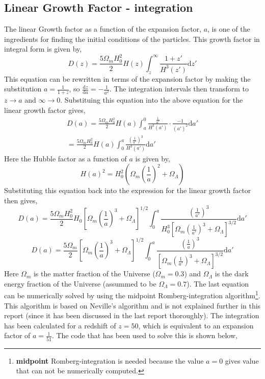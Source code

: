 


\subsection{Linear Growth Factor - integration}

The linear Growth factor as a function of the expansion factor, $a$, is one of the ingredients for finding the initial conditions of the particles. This growth factor in integral form is given by,
\begin{equation*}
D(z) = \frac{5\Omega_mH_0^2}{2}H(z) \int_z^{\infty} \frac{1+z'}{H^3(z')}\mathrm{d}z'
\end{equation*}
This equation can be rewritten in terms of the expansion factor by making the substitution $a = \frac{1}{1+z}$, so $\frac{\mathrm{d}z}{\mathrm{d}a} = -\frac{1}{a^2}$. The integration intervals then transform to $z \rightarrow a$ and $\infty \rightarrow 0$. Substituing this equation into the above equation for the linear growth factor gives,
\begin{gather*}
D(a) = \frac{5\Omega_m H_0^2}{2}H(a) \int_a^0 \frac{\frac{1}{a'}}{H^3(a')}\cdot \frac{-1}{(a')^2}\mathrm{d}a'\\
= \frac{5\Omega_m H_0^2}{2}H(a) \int_0^a \frac{\left(\frac{1}{a'}\right)^3}{H^3(a')}\mathrm{d}a'
\end{gather*}
Here the Hubble factor as a function of $a$ is given by,
\begin{equation*}
H(a)^2 = H_0^2 (\Omega_m\left(\frac{1}{a}\right)^2 + \Omega_{\Lambda})
\end{equation*}
Substituting this equation back into the expression for the linear growth factor then gives,
\begin{equation*}
D(a) = \frac{5\Omega_mH_0^2}{2}H_0 \left[\Omega_m\left(\frac{1}{a}\right)^3 + \Omega_{\Lambda}\right]^{1/2} \int_0^a \frac{\left(\frac{1}{a'}\right)^3}{H_0^3 \left[\Omega_m\left(\frac{1}{a'}\right)^3+ \Omega_{\Lambda}\right]^{3/2} }\mathrm{d}a'
\end{equation*}
\begin{equation}
D(a) = \frac{5\Omega_m}{2}\left[\Omega_m\left(\frac{1}{a}\right)^3 + \Omega_{\Lambda}\right]^{1/2} \int_0^a \frac{\left(\frac{1}{a}\right)^3}{\left[\Omega_m\left(\frac{1}{a'}\right)^3+\Omega_{\Lambda}\right]^{3/2}}\mathrm{d}a'
\end{equation}
Here $\Omega_m$ is the matter fraction of the Universe ($\Omega_m = 0.3$) and $\Omega_{\Lambda}$ is the dark energy fraction of the Universe (assummed to be $\Omega_{\Lambda} = 0.7$). The last equation can be numerically solved by using the midpoint Romberg-integration algorithm\footnote{\textbf{midpoint} Romberg-integration is needed because the value $a=0$ gives value that can not be numerically computed.}. This algorithm is based on Neville's algorithm and is not explained further in this report (since it has been discussed in the last report thoroughly). The integration has been calculated for a redshift of $z = 50$, which is equivalent to an expansion factor of $a = \frac{1}{51}$. The code that has been used to solve this is shown below,


